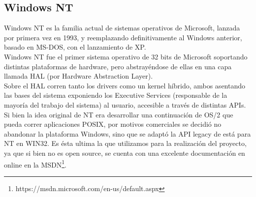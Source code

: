 \subsection{Windows NT}

Windows NT es la familia actual de sistemas operativos de Microsoft, lanzada
por primera vez en 1993, y reemplazando definitivamente al Windows anterior,
basado en MS-DOS, con el lanzamiento de XP.\\

Windows NT fue el primer sistema operativo de 32 bits de Microsoft soportando
distintas plataformas de hardware, pero abstrayéndose de ellas en una capa
llamada HAL (por Hardware Abstraction Layer).\\

Sobre el HAL corren tanto los drivers como un kernel híbrido, ambos asentando
las bases del sistema exponiendo los Executive Services (responsable de la
mayoría del trabajo del sistema) al usuario, accesible a través de distintas
APIs.\\

Si bien la idea original de NT era desarrollar una continuación de OS/2 que
pueda correr aplicaciones POSIX, por motivos comerciales se decidió no abandonar
la plataforma Windows, sino que se adaptó la API legacy de está para NT en
WIN32. Es ésta ultima la que utilizamos para la realización del proyecto, ya que
si bien no es open source, se cuenta con una excelente documentación en online
en la MSDN\footnote{https://msdn.microsoft.com/en-us/default.aspx}.\\

